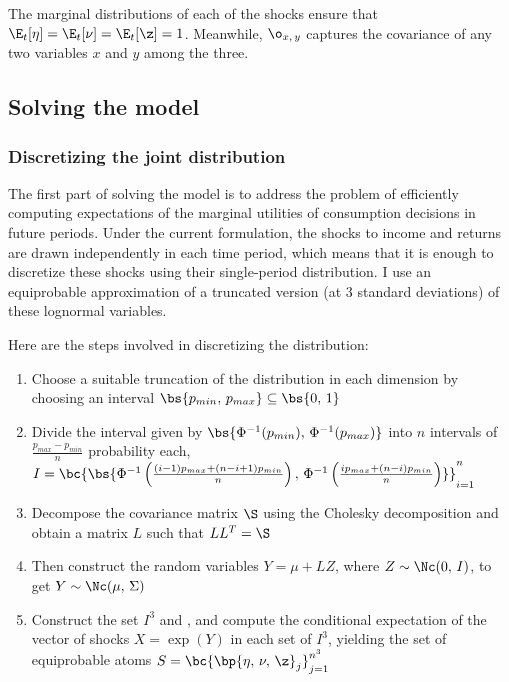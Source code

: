 The marginal distributions of each of the shocks ensure that $\E_t[\eta] = \E_t[\nu] = \E_t[\z] = 1$. Meanwhile, $\o_{x,\,y}$ captures the covariance of any two variables $x$ and $y$ among the three.

\subsection{Solving the model}

\subsubsection{Discretizing the joint distribution}\label{discretization}

The first part of solving the model is to address the problem of efficiently computing expectations of the marginal utilities of consumption decisions in future periods. Under the current formulation, the shocks to income and returns are drawn independently in each time period, which means that it is enough to discretize these shocks using their single-period distribution. I use an equiprobable approximation of a truncated version (at 3 standard deviations) of these lognormal variables.

Here are the steps involved in discretizing the distribution:
\begin{enumerate}
    \item Choose a suitable truncation of the distribution in each dimension by choosing an interval $\bs{p_{min},\,p_{max}} \subseteq \bs{0,\,1}$
    \item Divide the interval given by $\bs{\Phi^{-1}(p_{min}),\,\Phi^{-1}(p_{max})}$ into $n$ intervals of $\frac{p_{max} - p_{min}}{n}$ probability each, $I = \bc{\bs{\Phi^{-1}\left(\frac{(i - 1)p_{max} + (n - i + 1)p_{min}}{n}\right),\,\Phi^{-1}\left(\frac{ip_{max} + (n - i)p_{min}}{n}\right)}}_{i=1}^{n}$
    \item Decompose the covariance matrix $\S$ using the Cholesky decomposition and obtain a matrix $L$ such that $LL^T = \S$
    \item Then construct the random variables $Y = \mu + LZ$, where $Z \sim \Nc(0,\,I)$, to get $Y \sim \Nc(\mu,\,\Sigma)$
    \item Construct the set $I^3$ and , and compute the conditional expectation of the vector of shocks $X = \exp(Y)$ in each set of $I^3$, yielding the set of equiprobable atoms $S = \bc{\bp{\eta,\,\nu,\,\z}_{j}}_{j=1}^{n^3}$
\end{enumerate}


